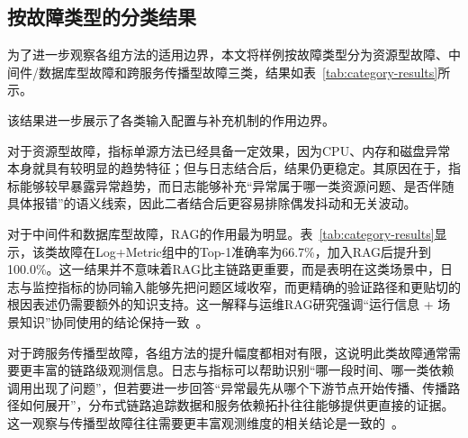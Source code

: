 \subsection{按故障类型的分类结果}

为了进一步观察各组方法的适用边界，本文将样例按故障类型分为资源型故障、中间件/数据库型故障和跨服务传播型故障三类，结果如表~\ref{tab:category-results}所示。

\begin{table}[htbp]
\centering
\caption{按故障类型划分的Top-1准确率}
\label{tab:category-results}
\footnotesize
\setlength{\tabcolsep}{3pt}
\renewcommand{\arraystretch}{1.12}
\end{table}

该结果进一步展示了各类输入配置与补充机制的作用边界。

对于资源型故障，指标单源方法已经具备一定效果，因为CPU、内存和磁盘异常本身就具有较明显的趋势特征；但与日志结合后，结果仍更稳定。其原因在于，指标能够较早暴露异常趋势，而日志能够补充“异常属于哪一类资源问题、是否伴随具体报错”的语义线索，因此二者结合后更容易排除偶发抖动和无关波动。

对于中间件和数据库型故障，RAG的作用最为明显。表~\ref{tab:category-results}显示，该类故障在Log+Metric组中的Top-1准确率为66.7\%，加入RAG后提升到100.0\%。这一结果并不意味着RAG比主链路更重要，而是表明在这类场景中，日志与监控指标的协同输入能够先把问题区域收窄，而更精确的验证路径和更贴切的根因表述仍需要额外的知识支持。这一解释与运维RAG研究强调“运行信息 + 场景知识”协同使用的结论保持一致~\cite{zhang2024rag4itops,isaza2024ragincident}。

对于跨服务传播型故障，各组方法的提升幅度都相对有限，这说明此类故障通常需要更丰富的链路级观测信息。日志与指标可以帮助识别“哪一段时间、哪一类依赖调用出现了问题”，但若要进一步回答“异常最先从哪个下游节点开始传播、传播路径如何展开”，分布式链路追踪数据和服务依赖拓扑往往能够提供更直接的证据。这一观察与传播型故障往往需要更丰富观测维度的相关结论是一致的~\cite{cheng2023rcasurvey,zhang2024fdsurvey}。

